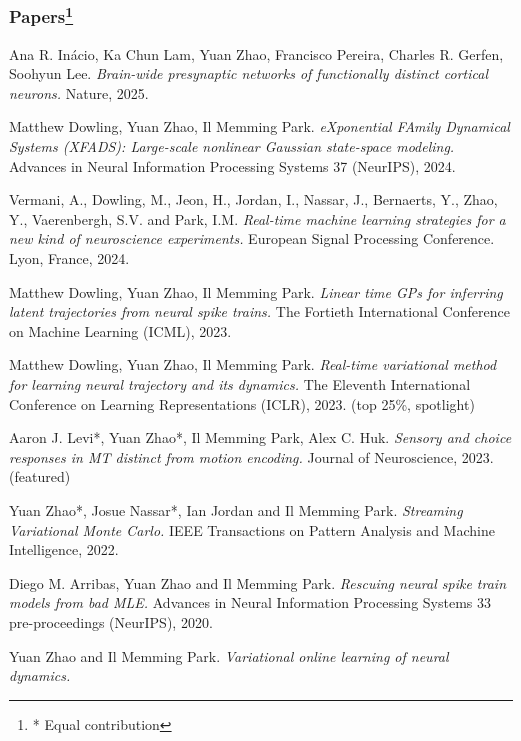 \documentclass[11pt]{article}
\begin{document}
\subsubsection*{Papers\footnote{* Equal contribution}}
\begin{enumerate}[label={[\arabic*]}]
    \item Ana R. Inácio, Ka Chun Lam, Yuan Zhao, Francisco Pereira, Charles R. Gerfen, Soohyun Lee. 
          \textit{Brain-wide presynaptic networks of functionally distinct cortical neurons.} 
          Nature, 2025.
    \item Matthew Dowling, Yuan Zhao, Il Memming Park.
          \textit{eXponential FAmily Dynamical Systems (XFADS): Large-scale nonlinear Gaussian state-space modeling.}
          Advances in Neural Information Processing Systems 37 (NeurIPS), 2024.
    \item Vermani, A., Dowling, M., Jeon, H., Jordan, I., Nassar, J., Bernaerts, Y., Zhao, Y., Vaerenbergh, S.V. and Park, I.M. 
          \textit{Real-time machine learning strategies for a new kind of neuroscience experiments.}
          European Signal Processing Conference. Lyon, France, 2024.
    \item Matthew Dowling, Yuan Zhao, Il Memming Park. 
          \textit{Linear time GPs for inferring latent trajectories from neural spike trains.}
          The Fortieth International Conference on Machine Learning (ICML), 2023.
    \item Matthew Dowling, Yuan Zhao, Il Memming Park.
          \textit{Real-time variational method for learning neural trajectory and its dynamics.}
          The Eleventh International Conference on Learning Representations (ICLR), 2023. (top 25\%, spotlight)
    \item Aaron J. Levi*, Yuan Zhao*, Il Memming Park, Alex C. Huk. 
          \textit{Sensory and choice responses in MT distinct from motion encoding.}
          Journal of Neuroscience, 2023. (featured)
    \item Yuan Zhao*, Josue Nassar*, Ian Jordan and Il Memming Park.
          \textit{Streaming Variational Monte Carlo.}
          IEEE Transactions on Pattern Analysis and Machine Intelligence, 2022.
    \item Diego M. Arribas, Yuan Zhao and Il Memming Park. 
          \textit{Rescuing neural spike train models from bad MLE.}
          Advances in Neural Information Processing Systems 33 pre-proceedings (NeurIPS), 2020.
    \item Yuan Zhao and Il Memming Park. 
          \textit{Variational online learning of neural dynamics.}

\end{enumerate}
\end{document}
